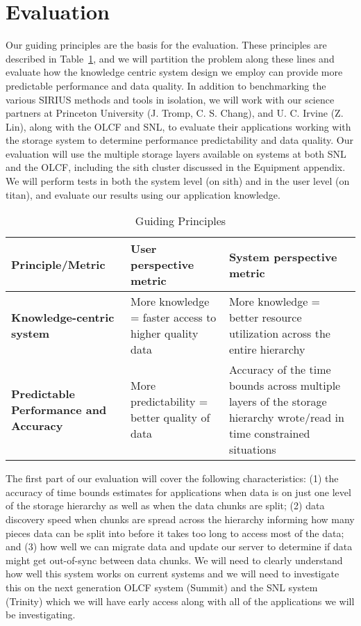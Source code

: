\section{Evaluation}
\label{sec:evaluation}

Our guiding principles are the basis for the evaluation. These principles are
described in Table~\ref{table:eval}, and we will partition the problem along these
lines and evaluate how the knowledge centric system design we employ can
provide more predictable performance and data quality. 
In addition to benchmarking the various SIRIUS methods and tools in isolation,
we will work with our science partners at Princeton University (J. Tromp, C. S. Chang),
and U. C. Irvine (Z. Lin), along with the OLCF and SNL,
to evaluate their applications working with the storage system to
determine performance predictability and data quality.  Our evaluation 
will use the multiple storage layers available on systems at both SNL and the
OLCF, including the sith cluster discussed in the Equipment appendix. 
 We will perform tests in both the system level (on sith) and in
the user level (on titan), and evaluate our results using our application
knowledge.


\begin{table}[ht]
\small
\centering
\caption{Guiding Principles}
\label{table:eval}
\begin{tabular}{ | p{1.4in} | p{2in} | p{2.5in} | }
  \hline
  {\bf Principle/Metric}                   & {\bf User perspective metric}   & {\bf System perspective metric }\\ \hline
  {\bf Knowledge-centric system}           & More knowledge = faster access to higher quality data &  More knowledge = better resource utilization across the entire hierarchy \\ \hline
  {\bf Predictable Performance and Accuracy}   & More predictability = better quality of data &  Accuracy of the time bounds across multiple layers of the storage hierarchy wrote/read in time constrained situations\\ \hline
\end{tabular}
\vspace{-2ex}
\normalsize
\end{table}


The first part of our evaluation will cover the following characteristics: (1)
the accuracy of time bounds estimates for applications when data is on just one
level of the storage hierarchy as well as when the data chunks are split; (2)
data discovery speed when chunks are spread across the hierarchy informing how
many pieces data can be split into before it takes too long to access most of
the data; and (3) how well we can migrate data and update our server to
determine if data might get out-of-sync between data chunks.  We will need to
clearly understand how well this system works on current systems and we will
need to investigate this on the next generation OLCF system (Summit) and the
SNL system (Trinity) which we will have early access along with all of the
applications we will be investigating.

